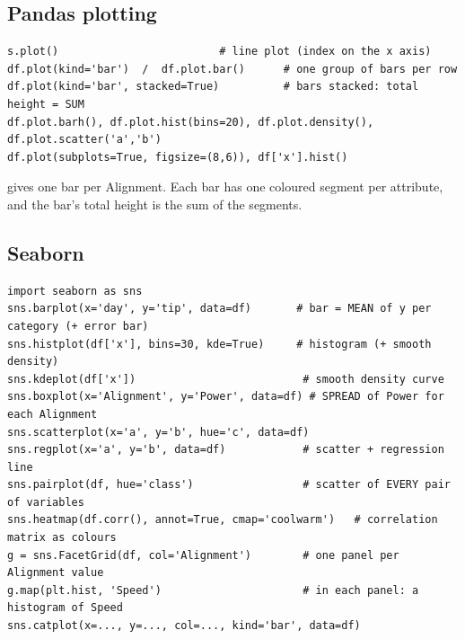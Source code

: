 \subsection{Pandas plotting}
\begin{codebox}
\begin{Verbatim}
s.plot()                         # line plot (index on the x axis)
df.plot(kind='bar')  /  df.plot.bar()      # one group of bars per row
df.plot(kind='bar', stacked=True)          # bars stacked: total height = SUM
df.plot.barh(), df.plot.hist(bins=20), df.plot.density(), df.plot.scatter('a','b')
df.plot(subplots=True, figsize=(8,6)), df['x'].hist()
\end{Verbatim}
\end{codebox}
 gives one bar per Alignment. Each bar has one coloured segment per attribute, and the bar's total height is the sum of the segments.

\subsection{Seaborn}
\begin{codebox}
\begin{Verbatim}
import seaborn as sns
sns.barplot(x='day', y='tip', data=df)       # bar = MEAN of y per category (+ error bar)
sns.histplot(df['x'], bins=30, kde=True)     # histogram (+ smooth density)
sns.kdeplot(df['x'])                          # smooth density curve
sns.boxplot(x='Alignment', y='Power', data=df) # SPREAD of Power for each Alignment
sns.scatterplot(x='a', y='b', hue='c', data=df)
sns.regplot(x='a', y='b', data=df)            # scatter + regression line
sns.pairplot(df, hue='class')                 # scatter of EVERY pair of variables
sns.heatmap(df.corr(), annot=True, cmap='coolwarm')   # correlation matrix as colours
g = sns.FacetGrid(df, col='Alignment')        # one panel per Alignment value
g.map(plt.hist, 'Speed')                      # in each panel: a histogram of Speed
sns.catplot(x=..., y=..., col=..., kind='bar', data=df)
\end{Verbatim}
\end{codebox}

